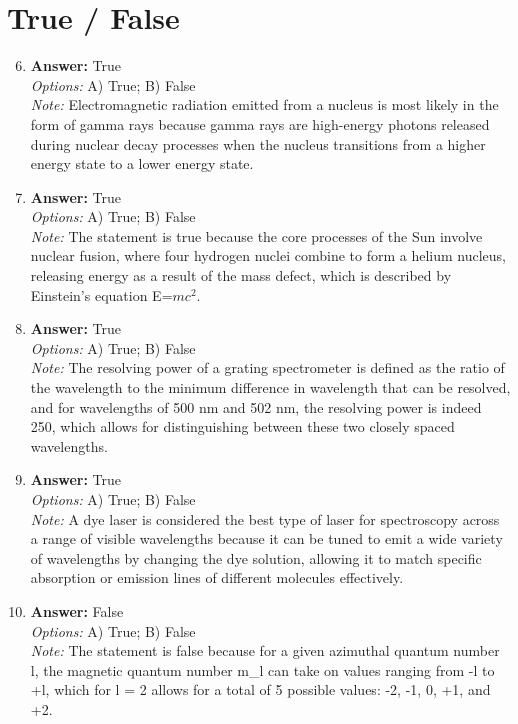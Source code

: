 \documentclass[12pt]{article}
\begin{document}
\section*{True / False}
\begin{enumerate}[label=\arabic*.]
\setcounter{enumi}{5}
\item \textbf{Answer:} True
\\ \textit{Options:} A) True; B) False
\\ \textit{Note:} Electromagnetic radiation emitted from a nucleus is most likely in the form of gamma rays because gamma rays are high-energy photons released during nuclear decay processes when the nucleus transitions from a higher energy state to a lower energy state.
\item \textbf{Answer:} True
\\ \textit{Options:} A) True; B) False
\\ \textit{Note:} The statement is true because the core processes of the Sun involve nuclear fusion, where four hydrogen nuclei combine to form a helium nucleus, releasing energy as a result of the mass defect, which is described by Einstein's equation E=$mc^2$.
\item \textbf{Answer:} True
\\ \textit{Options:} A) True; B) False
\\ \textit{Note:} The resolving power of a grating spectrometer is defined as the ratio of the wavelength to the minimum difference in wavelength that can be resolved, and for wavelengths of 500 nm and 502 nm, the resolving power is indeed 250, which allows for distinguishing between these two closely spaced wavelengths.
\item \textbf{Answer:} True
\\ \textit{Options:} A) True; B) False
\\ \textit{Note:} A dye laser is considered the best type of laser for spectroscopy across a range of visible wavelengths because it can be tuned to emit a wide variety of wavelengths by changing the dye solution, allowing it to match specific absorption or emission lines of different molecules effectively.
\item \textbf{Answer:} False
\\ \textit{Options:} A) True; B) False
\\ \textit{Note:} The statement is false because for a given azimuthal quantum number l, the magnetic quantum number m\_l can take on values ranging from -l to +l, which for l = 2 allows for a total of 5 possible values: -2, -1, 0, +1, and +2.
\end{enumerate}
\end{document}
